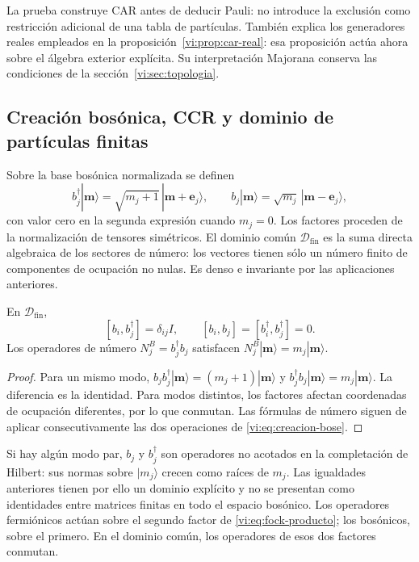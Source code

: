 La prueba construye CAR antes de deducir Pauli: no introduce la
exclusión como restricción adicional de una tabla de partículas.
También explica los generadores reales empleados en la
proposición~\ref{vi:prop:car-real}: esa proposición actúa ahora
sobre el álgebra exterior explícita. Su interpretación Majorana
conserva las condiciones de la sección~\ref{vi:sec:topologia}.

\subsection{Creación bosónica, CCR y dominio de partículas finitas}
\label{vi:subsec:ccr-construccion}

Sobre la base bosónica normalizada se definen
\begin{equation}
 b_j^\dagger|\boldsymbol m\rangle=
 \sqrt{m_j+1}\,|\boldsymbol m+\boldsymbol e_j\rangle,
 \qquad
 b_j|\boldsymbol m\rangle=
 \sqrt{m_j}\,|\boldsymbol m-\boldsymbol e_j\rangle,
 \label{vi:eq:creacion-bose}
\end{equation}
con valor cero en la segunda expresión cuando \(m_j=0\).
Los factores proceden de la normalización de tensores simétricos.
El dominio común \(\mathcal D_{\mathrm{fin}}\) es la suma directa
algebraica de los sectores de número: los vectores tienen sólo un
número finito de componentes de ocupación no nulas. Es denso e
invariante por las aplicaciones anteriores.

\begin{theorem}
\label{vi:thm:ccr-construidas}
En \(\mathcal D_{\mathrm{fin}}\),
\[
 [b_i,b_j^\dagger]=\delta_{ij}I,\qquad
 [b_i,b_j]=[b_i^\dagger,b_j^\dagger]=0.
\]
Los operadores de número \(N_j^B=b_j^\dagger b_j\) satisfacen
\(N_j^B|\boldsymbol m\rangle=m_j|\boldsymbol m\rangle\).
\end{theorem}
\begin{proof}
Para un mismo modo,
\(b_jb_j^\dagger|\boldsymbol m\rangle=(m_j+1)|\boldsymbol m\rangle\)
y \(b_j^\dagger b_j|\boldsymbol m\rangle=m_j|\boldsymbol m\rangle\).
La diferencia es la identidad. Para modos distintos, los factores
afectan coordenadas de ocupación diferentes, por lo que conmutan.
Las fórmulas de número siguen de aplicar consecutivamente las dos
operaciones de \eqref{vi:eq:creacion-bose}.
\end{proof}

Si hay algún modo par, \(b_j\) y \(b_j^\dagger\) son operadores
no acotados en la completación de Hilbert: sus normas sobre
\(|m_j\rangle\) crecen como raíces de \(m_j\). Las igualdades
anteriores tienen por ello un dominio explícito y no se presentan
como identidades entre matrices finitas en todo el espacio bosónico.
Los operadores fermiónicos actúan sobre el segundo factor de
\eqref{vi:eq:fock-producto}; los bosónicos, sobre el primero. En
el dominio común, los operadores de esos dos factores conmutan.

